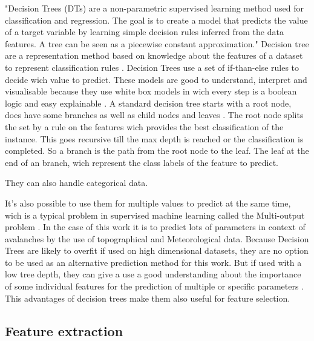 \documentclass[12pt,a4paper]{article}
\begin{document}
"Decision Trees (DTs) are a non-parametric supervised learning method used for classification and regression. The goal is to create a model that predicts the value of a target variable by learning simple decision rules inferred from the data features. A tree can be seen as a piecewise constant approximation." \autocites{Scikit-learn:2022}
Decision tree are a representation method based on knowledge about the features of a dataset to represent classification rules \autocites{SUGUMARAN2007930}.
Decision Trees use a set of if-than-else rules to decide wich value to predict. These models are good to understand, interpret and visualisable because they use white box models in wich every step is a boolean logic and easy explainable \autocites{Scikit-learn:2022}. A standard decision tree starts with a root node, does have some branches as well as child nodes and leaves \autocites{SUGUMARAN2007930}. 
The root node splits the set by a rule on the features wich provides the best classification of the instance. This goes recursive till the max depth is reached or the classification is completed. So a branch is the path from the root node to the leaf. The leaf at the end of an branch, wich represent the class labels of the feature to predict. \autocites{SUGUMARAN2007930}


They can also handle categorical data.

It's also possible to use them for multiple values to predict at the same time, wich is a typical problem in supervised machine learning called the Multi-output problem \autocites{Scikit-learn:2022}. In the case of this work it is to predict lots of parameters in context of avalanches by the use of topographical and Meteorological data.
Because Decision Trees are likely to overfit if used on high dimensional datasets, they are no option to be used as an alternative prediction method for this work. But if used with a low tree depth, they can give a use a good understanding about the importance of some individual features for the prediction of multiple or specific parameters \autocites{Scikit-learn:2022}.
This advantages of decision trees make them also useful for feature selection. 







\subsection{Feature extraction}
\end{document}
